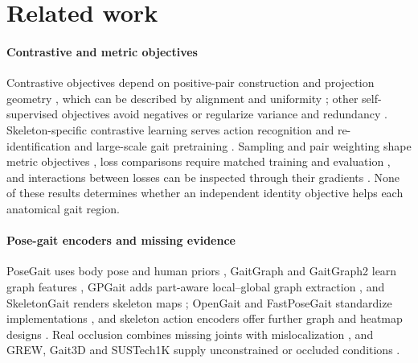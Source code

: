 \documentclass[journal]{IEEEtran}
\begin{document}
\section{Related work}
\label{sec:related}

\paragraph{Contrastive and metric objectives}
Contrastive objectives depend on positive-pair construction and projection
geometry \cite{chen2020simclr,he2020moco,khosla2020supervised}, which can be
described by alignment and uniformity \cite{wang2020alignment}; other
self-supervised objectives avoid negatives or regularize variance and
redundancy \cite{grill2020byol,chen2021simsiam,zbontar2021barlow,bardes2022vicreg}.
Skeleton-specific contrastive learning serves action recognition and
re-identification \cite{thoker2021skeleton,rao2024skeleton,lin2023actclr} and
large-scale gait pretraining \cite{cosma2026gaitpt}. Sampling and pair weighting
shape metric objectives \cite{wu2017sampling,wang2019multisimilarity}, loss
comparisons require matched training and evaluation \cite{musgrave2020reality},
and interactions between losses can be inspected through their gradients
\cite{sener2018multiobjective,yu2020gradient}. None of these results determines
whether an independent identity objective helps each anatomical gait region.

\paragraph{Pose-gait encoders and missing evidence}
PoseGait uses body pose and human priors \cite{liao2020posegait}, GaitGraph
and GaitGraph2 learn graph features \cite{teepe2021gaitgraph,teepe2022gaitgraph2},
GPGait adds part-aware local--global graph extraction \cite{fu2023gpgait}, and
SkeletonGait renders skeleton maps \cite{fan2024skeletongait}; OpenGait and
FastPoseGait standardize implementations \cite{fan2022opengait,meng2023fastposegait},
and skeleton action encoders offer further graph and heatmap designs
\cite{shi2019adaptive,li2019actional,liu2020msg3d,cheng2020shift,duan2022posec3d}.
Real occlusion combines missing joints with mislocalization
\cite{li2024survey,huang2024occluded,chen2023iopstl}, and GREW, Gait3D and
SUSTech1K supply unconstrained or occluded conditions
\cite{zhu2021grew,zheng2022gait3d,shen2023lidargait}.
\end{document}
